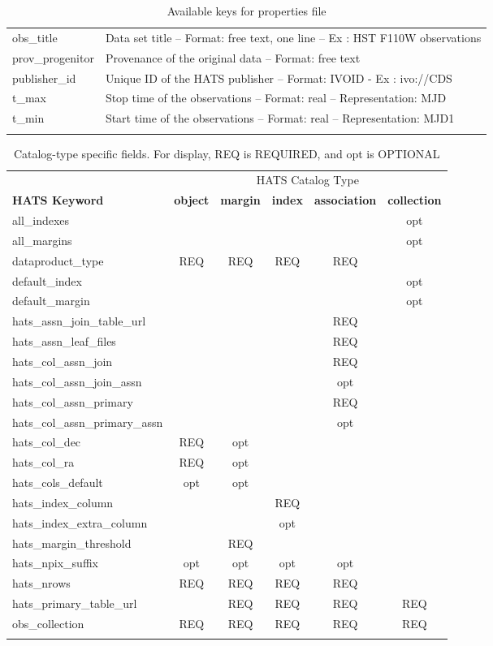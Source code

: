 \documentclass[11pt,a4paper]{ivoa}
\begin{document}
\begin{longtable}[h!]{D{0.33\textwidth} D{0.67\textwidth}}
obs\_title &Data set title – Format: free text, one line – Ex : HST F110W observations \\
prov\_progenitor &Provenance of the original data – Format: free text \\
publisher\_id &Unique ID of the HATS publisher – Format: IVOID - Ex : ivo://CDS \\
t\_max &Stop time of the observations – Format: real – Representation: MJD \\
t\_min &Start time of the observations – Format: real – Representation: MJD1 \\
\sptablerule    
\caption{Available keys for properties file}
\label{tab:properties}
\end{longtable}

\begin{table}[!htb]
    \begin{center}
      \begin{tabular}{l c c c c c}
        \sptablerule
        &\multicolumn{5}{c}{HATS Catalog Type} \\
        \textbf{HATS Keyword} & \textbf{object} & \textbf{margin} & \textbf{index} & \textbf{association}  & \textbf{collection} \\
        \sptablerule
        all\_indexes & & & & &opt \\
all\_margins & & & & &opt \\
dataproduct\_type &REQ &REQ &REQ &REQ & \\
default\_index & & & & &opt \\
default\_margin & & & & &opt \\
hats\_assn\_join\_table\_url & & & &REQ & \\
hats\_assn\_leaf\_files & & & &REQ & \\
hats\_col\_assn\_join & & & &REQ & \\
hats\_col\_assn\_join\_assn & & & &opt & \\
hats\_col\_assn\_primary & & & &REQ & \\
hats\_col\_assn\_primary\_assn & & & &opt & \\
hats\_col\_dec &REQ &opt & & & \\
hats\_col\_ra &REQ &opt & & & \\
hats\_cols\_default &opt &opt & & & \\
hats\_index\_column & & &REQ & & \\
hats\_index\_extra\_column & & &opt & & \\
hats\_margin\_threshold & &REQ & & & \\
hats\_npix\_suffix &opt &opt &opt &opt & \\
hats\_nrows &REQ &REQ &REQ &REQ & \\
hats\_primary\_table\_url & &REQ &REQ &REQ &REQ \\
obs\_collection &REQ &REQ &REQ &REQ &REQ \\
        \sptablerule
    \end{tabular}
    \caption{Catalog-type specific fields. For display, REQ is REQUIRED, and opt is OPTIONAL}
    \label{tab:propertyRequirements}
  \end{center}
\end{table}
\end{document}
